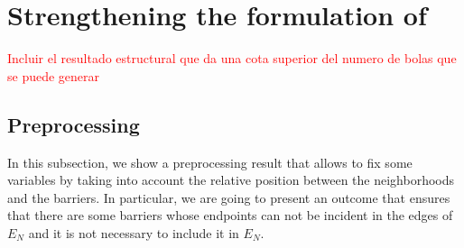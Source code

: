 \documentclass[a4paper]{elsarticle}
\newcommand{\TSP}{{\sf{H-TSP-S} \xspace}}
\begin{document}
%
%

\section{Strengthening the formulation of \TSP}
\textcolor{red}{Incluir el resultado estructural que da una cota superior del numero de bolas que se puede generar}
\subsection{Preprocessing}
In this subsection, we show a preprocessing result that allows to fix some variables by taking into account the relative position between the neighborhoods and the barriers.
In particular, we are going to present an outcome that ensures that there are some barriers whose endpoints can not be incident in the edges of $E_N$ and it is not necessary to include it in $E_N$. 
\end{document}
